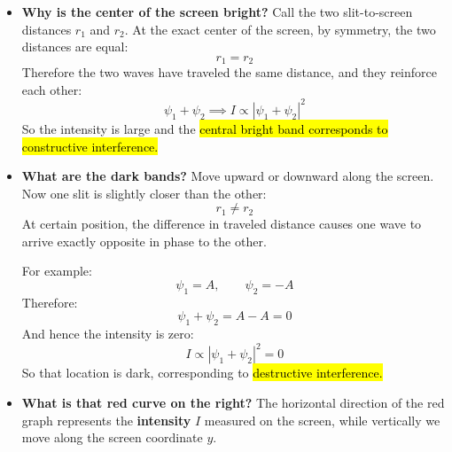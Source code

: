 \begin{deepeningbox}
\begin{itemize}
        \item[\textcolor{Green3}{\faIcon{question-circle}}] \textcolor{Green3}{\textbf{Why is the center of the screen bright?}} Call the two slit-to-screen distances $r_1$ and $r_2$. At the exact center of the screen, by symmetry, the two distances are equal:
            \begin{equation*}
                r_1 = r_2
            \end{equation*}
            Therefore the two waves have traveled the same distance, and they reinforce each other:
            \begin{equation*}
                \psi_1 + \psi_2 \implies I \propto \left|\psi_1 + \psi_2\right|^{2}
            \end{equation*}
            So the intensity is large and the \hl{central bright band corresponds to constructive interference.}

        \item[\textcolor{Green3}{\faIcon{question-circle}}] \textcolor{Green3}{\textbf{What are the dark bands?}} Move upward or downward along the screen. Now one slit is slightly closer than the other:
            \begin{equation*}
                r_1 \neq r_2
            \end{equation*}
            At certain position, the difference in traveled distance causes one wave to arrive exactly opposite in phase to the other.

            For example:
            \begin{equation*}
                \psi_1 = A, \qquad \psi_2 = -A
            \end{equation*}
            Therefore:
            \begin{equation*}
                \psi_1 + \psi_2 = A - A = 0
            \end{equation*}
            And hence the intensity is zero:
            \begin{equation*}
                I \propto \left|\psi_1 + \psi_2\right|^{2} = 0
            \end{equation*}
            So that location is dark, corresponding to \hl{destructive interference.}

        \item[\textcolor{Green3}{\faIcon{question-circle}}] \textcolor{Green3}{\textbf{What is that red curve on the right?}} The horizontal direction of the red graph represents the \textbf{intensity} $I$ measured on the screen, while vertically we move along the screen coordinate $y$.


\end{itemize}
\end{deepeningbox}
